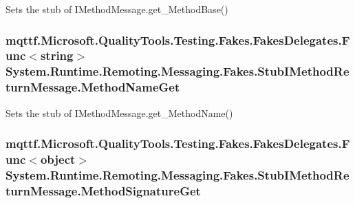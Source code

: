 Sets the stub of I\-Method\-Message.\-get\-\_\-\-Method\-Base()

\hypertarget{class_system_1_1_runtime_1_1_remoting_1_1_messaging_1_1_fakes_1_1_stub_i_method_return_message_a5e3ffc7880fad625664a777a907ec7fb}{
\subsubsection[{Method\-Name\-Get}]{\setlength{\rightskip}{0pt plus 5cm}mqttf.\-Microsoft.\-Quality\-Tools.\-Testing.\-Fakes.\-Fakes\-Delegates.\-Func$<$string$>$ System.\-Runtime.\-Remoting.\-Messaging.\-Fakes.\-Stub\-I\-Method\-Return\-Message.\-Method\-Name\-Get}}\label{class_system_1_1_runtime_1_1_remoting_1_1_messaging_1_1_fakes_1_1_stub_i_method_return_message_a5e3ffc7880fad625664a777a907ec7fb}


Sets the stub of I\-Method\-Message.\-get\-\_\-\-Method\-Name()

\hypertarget{class_system_1_1_runtime_1_1_remoting_1_1_messaging_1_1_fakes_1_1_stub_i_method_return_message_a9ddd64da6023d1409d08de310eff094e}{
\subsubsection[{Method\-Signature\-Get}]{\setlength{\rightskip}{0pt plus 5cm}mqttf.\-Microsoft.\-Quality\-Tools.\-Testing.\-Fakes.\-Fakes\-Delegates.\-Func$<$object$>$ System.\-Runtime.\-Remoting.\-Messaging.\-Fakes.\-Stub\-I\-Method\-Return\-Message.\-Method\-Signature\-Get}}\label{class_system_1_1_runtime_1_1_remoting_1_1_messaging_1_1_fakes_1_1_stub_i_method_return_message_a9ddd64da6023d1409d08de310eff094e}


